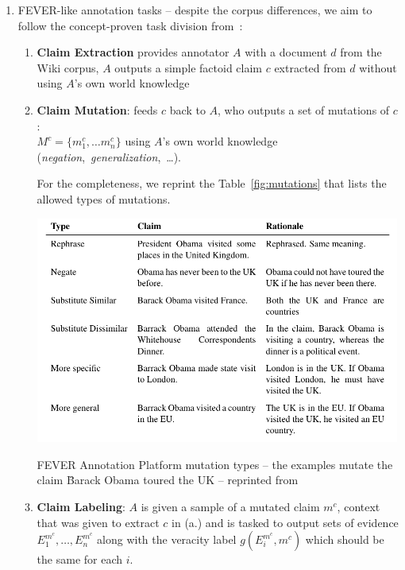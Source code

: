 \begin{enumerate}
    \item {\techbf FEVER-like annotation tasks} -- despite the corpus differences, we aim to follow the concept-proven task division from~\cite{fever}:
    \begin{enumerate}
        \item[\itembox{\textsf{WF1a}}] \textbf{Claim Extraction} provides annotator $A$ with a document $d$ from the \textsf{Wiki} corpus, $A$ outputs a simple factoid claim $c$ extracted from $d$ without using $A$'s own world knowledge
        \label{wf1a}
        \item [\itembox{\textsf{WF1b}}]\textbf{Claim Mutation}: feeds $c$ back to $A$, who outputs a set of mutations of $c$: \\
        $M^c=\{m^c_1,\dots m^c_n\}$ using $A$'s own world knowledge (\textit{negation},~\textit{generalization},~\dots).
        
        For the completeness, we reprint the Table~\ref{fig:mutations} that lists the allowed types of mutations.\label{wf1b}
        
\begin{table}[H]
\begin{ctucolortab}
\includegraphics[width=12cm]{fig/mutations.pdf}
\caption[\textsf{FEVER Annotation Platform} mutation types]{\textsf{FEVER Annotation Platform} mutation types -- the examples mutate the claim \"{Barack Obama toured the UK} -- reprinted from~\cite{fever}}
\label{fig:mutations}
\end{ctucolortab}
\end{table}
        \item[\itembox{\textsf{WF2~}}] \textbf{Claim Labeling}: $A$ is given a sample of a mutated claim $m^c$, context that was given to extract $c$ in (a.) and is tasked to output sets of evidence $E^{m^c}_1,\dots,E^{m^c}_n$ along with the veracity label $g(E^{m^c}_i,m^c)$ which should be the same for each $i$. 
        \label{wf2}
        

\end{enumerate}
\end{enumerate}

